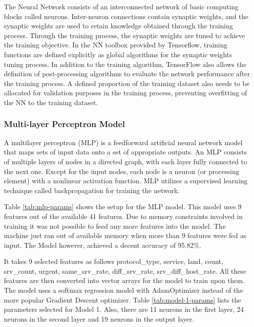 \documentclass[12pt]{article}
\theoremstyle{definition}
\begin{document}
		The Neural Network consists of an interconnected network of basic computing blocks called
		neurons. Inter-neuron connections contain synaptic weights, and the synaptic weights are
		used to retain knowledge obtained through the training process. Through the training
		process, the synaptic weights are tuned to achieve the training objective. In the NN
		toolbox provided by Tensorflow, training functions are defined explicitly as global
		algorithms for the synaptic weights tuning process. In addition to the training algorithm,
		TensorFlow also allows the definition of post-processing algorithms to evaluate the
		network performance after the training process. A defined proportion of the training
		dataset also needs to be allocated for validation purposes in the training process,
		preventing overfitting of the NN to the training dataset.
	
		\subsubsection{Multi-layer Perceptron Model}
		A multilayer perceptron (MLP) is a feedforward artificial neural network model that maps sets of input data onto a set of appropriate outputs. An MLP consists of multiple layers of nodes in a directed graph, with each layer fully connected to the next one. Except for the input nodes, each node is a neuron (or processing element) with a nonlinear activation function. MLP utilizes a supervised learning technique called backpropagation for training the network.
		
		Table \ref{tab:mlp-params} shows the setup for the MLP model. This model uses 9 features out of the available 41 features. Due to memory constraints involved in training it was not possible to feed any more features into the model. The machine just ran out of available memory when more than 9 features were fed as input. The Model however, achieved a decent accuracy of 95.82\%.
		
		It takes 9 selected features as follows  protocol\_type, service, land, count, srv\_count, urgent, same\_srv\_rate, diff\_srv\_rate, srv\_diff\_host\_rate. All these features are then converted into vector arrays for the model to train upon them. The model uses a softmax regression model with AdamOptimizer instead of the more popular Gradient Descent optimizer. Table \ref{tab:model-1-params} lists the parameters selected for Model 1. Also, there are 11 neurons in the first layer, 24 neurons in the second layer and 19 neurons in the output layer.
		
\end{document}
